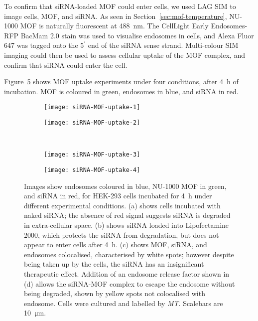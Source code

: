 To confirm that siRNA-loaded MOF could enter cells, we used LAG SIM to image cells, MOF, and siRNA. 
As seen in Section~\ref{sec:mof-temperature}, NU-1000 MOF is naturally fluorescent at \SI{488}{\nano\metre}. 
The CellLight Early Endosomes-RFP BacMam 2.0 stain was used to visualise endosomes in cells, and Alexa Fluor 647 was tagged onto the $5^\prime$ end of the siRNA sense strand. 
Multi-colour SIM imaging could then be used to assess cellular uptake of the MOF complex, and confirm that siRNA could enter the cell. 

Figure~\ref{fig:siRNA-MOF-uptake} shows MOF uptake experiments under four conditions, after \SI{4}{\hour} of incubation. 
MOF is coloured in green, endosomes in blue, and siRNA in red. 


\begin{figure}[tbp]
\centering
\begin{subfigure}[b]{0.49\textwidth}
	\texttt{[image: siRNA-MOF-uptake-1]}
	\caption{}\label{fig:siRNA-MOF-uptake-1}
\end{subfigure}
\hfill
\begin{subfigure}[b]{0.49\textwidth}
	\texttt{[image: siRNA-MOF-uptake-2]}
	\caption{}\label{fig:siRNA-MOF-uptake-2}
\end{subfigure}

~\newline
\begin{subfigure}[b]{0.49\textwidth}
	\texttt{[image: siRNA-MOF-uptake-3]}
	\caption{}\label{fig:siRNA-MOF-uptake-3}
\end{subfigure}
\hfill
\begin{subfigure}[b]{0.49\textwidth}
	\texttt{[image: siRNA-MOF-uptake-4]}
	\caption{}\label{fig:siRNA-MOF-uptake-4}
\end{subfigure}
\caption[MOFs: siRNA-loaded NU-1000 is endocytosed by HEK-293 cells, and released to the cytoplasm with an endosome release factor]{Images show endosomes coloured in blue, NU-1000 MOF in green, and siRNA in red, for HEK-293 cells incubated for \SI{4}{\hour} under different experimental conditions. (a) shows cells incubated with naked siRNA; the absence of red signal suggests siRNA is degraded in extra-cellular space. (b) shows siRNA loaded into Lipofectamine 2000, which protects the siRNA from degradation, but does not appear to enter cells after \SI{4}{\hour}. (c) shows MOF, siRNA, and endosomes colocalised, characterised by white spots; however despite being taken up by the cells, the siRNA has an insignificant therapeutic effect. Addition of an endosome release factor shown in (d) allows the siRNA-MOF complex to escape the endosome without being degraded, shown by yellow spots not colocalised with endosome. Cells were cultured and labelled by \textit{MT}. Scalebars are \SI{10}{\micro\metre}. }
\label{fig:siRNA-MOF-uptake}
\end{figure}

